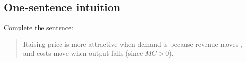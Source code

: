\documentclass[11pt]{article}
\begin{document}
\subsection*{One-sentence intuition}

Complete the sentence:

\begin{quote}
    Raising price is more attractive when demand is \underline{\hspace{3cm}} because revenue moves \underline{\hspace{3cm}}, and costs move \underline{\hspace{3cm}} when output falls (since $MC > 0$).
\end{quote}

\vspace{1em}
\end{document}
